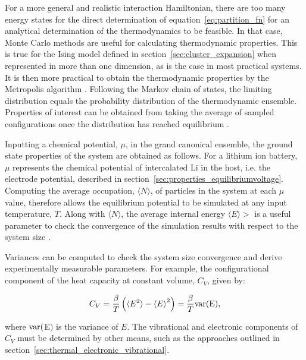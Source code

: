 \documentclass[../main.tex]{subfiles}
\begin{document}
For a more general and realistic interaction Hamiltonian, there are too many energy states for the direct determination of equation~\ref{eq:partition_fn} for an analytical determination of the thermodynamics to be feasible. In that case, Monte Carlo methods are useful for calculating thermodynamic properties. This is true for the Ising model defined in section~\ref{sec:cluster_expansion} when represented in more than one dimension, as is the case in most practical systems.  It is then more practical to obtain the thermodynamic properties by the Metropolis algorithm \cite{Metropolis1953}. Following the Markov chain of states, the limiting distribution equals the probability distribution of the thermodynamic ensemble. Properties of interest can be obtained from taking the average of sampled configurations once the distribution has reached equilibrium \cite{oviedo2015underpotential}.

Inputting a chemical potential, $\mu$, in the grand canonical ensemble, the ground state properties of the system are obtained as follows. For a lithium ion battery, $\mu$ represents the chemical potential of intercalated Li in the host, i.e. the electrode potential, described in section~\ref{sec:properties_equilibriumvoltage}. Computing the average occupation, $\langle N \rangle$, of particles in the system at each $\mu$ value, therefore allows the equilibrium potential to be simulated at any input temperature, $T$. Along with $\langle N \rangle$, the average internal energy $\langle{E}\rangle>$ is a useful parameter to check the convergence of the simulation results with respect to the system size \cite{mercer_influence_2017,Binder2009book,Kim2001ThermodynamicAK,darling1999}.

Variances can be computed to check the system size convergence and derive experimentally measurable parameters. For example, the configurational component of the heat capacity at constant volume, $C_{V}$, given by:

\begin{equation}
    C_{V} = \frac{\beta}{T}\left(\langle{E^{2}}\rangle -{\langle{E}\rangle}^{2}\right) =  \frac{\beta}{T}\rm{var}(E),
    \label{eq:mc_heat_cap}
\end{equation}

where $\rm{var}($E$)$ is the variance of $E$. The vibrational and electronic components of $C_{V}$ must be determined by other means, such as the approaches outlined in section~\ref{sec:thermal_electronic_vibrational}. 
\end{document}
